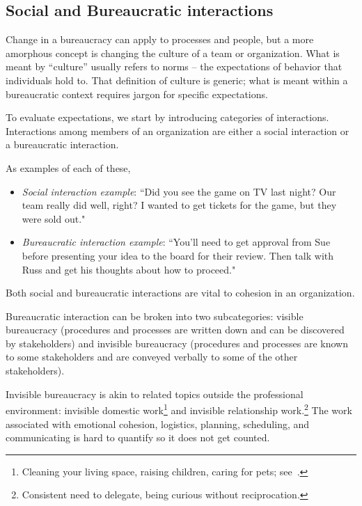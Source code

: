 
\subsection*{Social and Bureaucratic interactions\label{sec:socializing}}

Change in a bureaucracy can apply to processes and people, but a more amorphous concept is changing the culture of a team or organization. What is meant by ``culture'' usually refers to norms -- the expectations of behavior that individuals hold to. That definition of culture is generic; what is meant within a bureaucratic context requires jargon for specific expectations.

To evaluate expectations, we start by introducing categories of interactions. 
Interactions among members of an organization are either a social interaction or a bureaucratic interaction. 

As examples of each of these,
\begin{itemize}
\item \textit{Social interaction example}: ``Did you see the game on TV last night? Our team really did well, right? I wanted to get tickets for the game, but they were sold out."
\item \textit{Bureaucratic interaction example}: ``You'll need to get approval from Sue before presenting your idea to the board for their review. Then talk with Russ and get his thoughts about how to proceed."
\end{itemize}
Both social and bureaucratic interactions are vital to cohesion in an organization. 


Bureaucratic interaction can be broken into two subcategories: 
\gls{visible bureaucracy} \iftoggle{glossaryinmargin}{\marginpar{[Glossary]}}{}%
(procedures and processes are written down and can be discovered by stakeholders) and 
\gls{invisible bureaucracy} \iftoggle{glossaryinmargin}{\marginpar{[Glossary]}}{}%
(procedures and processes are known to some stakeholders and are conveyed verbally to some of the other stakeholders).

Invisible bureaucracy is akin to related topics outside the professional environment: invisible domestic work\footnote{Cleaning your living space, raising children, caring for pets; see~\cite{1987_Daniels}.} and invisible relationship work.\footnote{Consistent need to delegate, being curious without reciprocation.} The work associated with emotional cohesion, logistics, planning, scheduling, and communicating is hard to quantify so it does not get counted.


